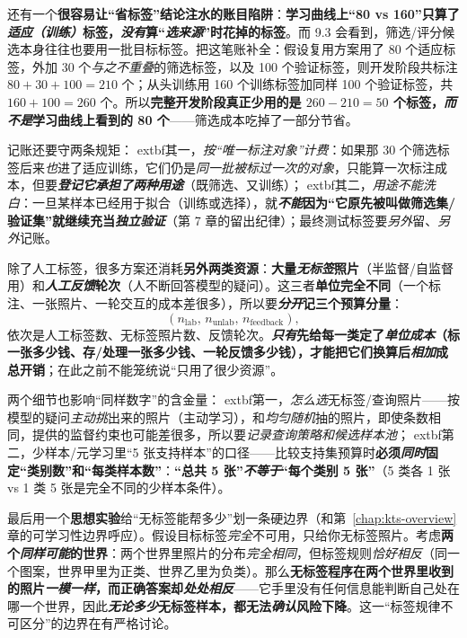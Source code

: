 \begin{samepage}
还有一个\textbf{很容易让“省标签”结论注水的账目陷阱}：\textbf{学习曲线上“80 vs 160”只算了\emph{适应（训练）}标签，\emph{没有}算“\emph{选来源}”时花掉的标签}。而 9.3 会看到，筛选/评分候选本身往往也要用一批目标标签。把这笔账补全：假设复用方案用了 80 个适应标签，外加 30 个\emph{与之不重叠}的筛选标签，以及 100 个验证标签，则开发阶段共标注 $80+30+100=210$ 个；从头训练用 160 个训练标签加同样 100 个验证标签，共 $160+100=260$ 个。所以\textbf{完整开发阶段真正少用的是 $260-210=50$ 个标签，\emph{而不是}学习曲线上看到的 80 个}——筛选成本吃掉了一部分节省。

记账还要守两条规矩：	extbf{其一，\emph{按“唯一标注对象”计费}}：如果那 30 个筛选标签后来\emph{也}进了适应训练，它们仍是\emph{同一批被标过一次的对象}，只能算一次标注成本，但要\textbf{\emph{登记它承担了两种用途}}（既筛选、又训练）；	extbf{其二，\emph{用途不能洗白}}：一旦某样本已经用于拟合（训练或选择），就\textbf{\emph{不能}因为“它原先被叫做筛选集/验证集”就继续充当\emph{独立验证}}（第 7 章的留出纪律）；最终测试标签要\emph{另外}留、\emph{另外}记账。

\end{samepage}

除了人工标签，很多方案还消耗\textbf{另外两类资源}：\textbf{大量\emph{无标签}照片}（半监督/自监督用）和\textbf{\emph{人工反馈}轮次}（人不断回答模型的疑问）。这三者\textbf{单位完全不同}（一个标注、一张照片、一轮交互的成本差很多），所以要\textbf{\emph{分开}记三个预算分量}：
\[ (n_{\mathrm{lab}},\,n_{\mathrm{unlab}},\,n_{\mathrm{feedback}}), \]
依次是人工标签数、无标签照片数、反馈轮次。\textbf{\emph{只有}先给每一类定了\emph{单位成本}（标一张多少钱、存/处理一张多少钱、一轮反馈多少钱），才能把它们换算后\emph{相加}成总开销}；在此之前不能笼统说“只用了很少资源”。

两个细节也影响“同样数字”的含金量：	extbf{第一，\emph{怎么选}无标签/查询照片}——按模型的疑问\emph{主动挑}出来的照片（主动学习），和\emph{均匀随机}抽的照片，即使条数相同，提供的监督约束也可能差很多，所以要\emph{记录查询策略和候选样本池}；	extbf{第二，少样本/元学习里“5 张支持样本”的口径}——比较支持集预算时\textbf{必须\emph{同时}固定“类别数”和“每类样本数”}：\textbf{“总共 5 张”\emph{不等于}“每个类别 5 张”}（5 类各 1 张 vs 1 类 5 张是完全不同的少样本条件）。

最后用一个\textbf{思想实验}给“无标签能帮多少”划一条硬边界（和第~\ref{chap:kts-overview}章的可学习性边界呼应）。假设目标标签\emph{完全}不可用，只给你无标签照片。考虑\textbf{两个\emph{同样可能}的世界}：两个世界里照片的分布\emph{完全相同}，但标签规则\emph{恰好相反}（同一个图案，世界甲里为正类、世界乙里为负类）。那么\textbf{无标签程序在两个世界里收到的照片\emph{一模一样}，而正确答案却\emph{处处相反}}——它手里没有任何信息能判断自己处在哪一个世界，因此\textbf{\emph{无论多少}无标签样本，都无法\emph{确认}风险下降}。这一“标签规律不可区分”的边界在有严格讨论。

